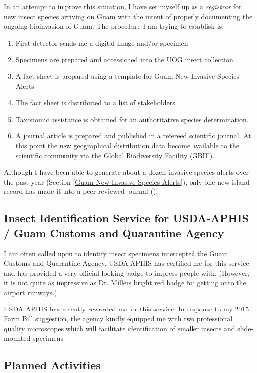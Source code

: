 \documentclass[12pt,oneside,english]{scrbook}
\begin{document}
In an attempt to improve this situation, I have set myself up as a \emph{registrar} for new insect species arriving on Guam with the intent of properly documenting the ongoing bioinvasion of Guam. The procedure I am trying to establish is:
\begin{enumerate}
\item First detector sends me a digital image and/or specimen
\item{Specimens are prepared and accessioned into the UOG insect collection}
\item{A fact sheet is prepared using a template for Guam New Invasive Species Alerts}
\item{The fact sheet is distributed to a list of stakeholders}
\item{Taxonomic assistance is obtained for an authoritative species determination.}
\item A journal article is prepared and published in a refereed scientific journal. At this point the new geographical distribution data become available to the scientific community via the Global Biodiversity Facility (GBIF).
\end{enumerate}

Although I have been able to generate about a dozen invasive species alerts over the past year (Section \ref{Guam New Invasive Species Alerts}), only one new island record has made it into a peer reviewed journal (\cite{Moore_Watson_Bamba_2014}).

\subsection{Insect Identification Service for USDA-APHIS / Guam Customs and Quarantine Agency}

I am often called upon to identify insect specimens intercepted the
Guam Customs and Quarantine Agency. USDA-APHIS has certified me for
this service and has provided a very official looking badge to impress
people with. (However, it is not quite as impressive as Dr. Millers
bright red badge for getting onto the airport runways.) 

USDA-APHIS has recently rewarded me for this service. In response to
my 2015 Farm Bill suggestion, the agency kindly equipped me with two professional quality microscopes which will facilitate identification 
of smaller insects and slide-mounted specimens.

\subsection{Planned Activities}
\end{document}
